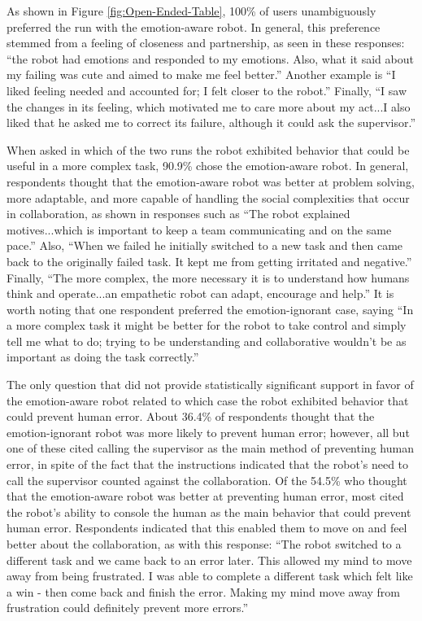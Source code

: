 \documentclass[12pt]{report}
\begin{document}
As shown in Figure \ref{fig:Open-Ended-Table}, 100\% of users unambiguously
preferred the run with the emotion-aware robot. In general, this preference
stemmed from a feeling of closeness and partnership, as seen in these responses:
``the robot had emotions and responded to my emotions. Also, what it said about
my failing was cute and aimed to make me feel better.'' Another example is ``I
liked feeling needed and accounted for; I felt closer to the robot.'' Finally,
``I saw the changes in its feeling, which motivated me to care more about my
act...I also liked that he asked me to correct its failure, although it could
ask the supervisor.''  

When asked in which of the two runs the robot exhibited behavior that could be
useful in a more complex task, 90.9\% chose the emotion-aware robot. In general,
respondents thought that the emotion-aware robot was better at problem solving,
more adaptable, and more capable of handling the social complexities that occur
in collaboration, as shown in responses such as ``The robot explained
motives...which is important to keep a team communicating and on the same
pace.'' Also, ``When we failed he initially switched to a new task and then came
back to the originally failed task. It kept me from getting irritated and
negative.'' Finally, ``The more complex, the more necessary it is to understand
how humans think and operate...an empathetic robot can adapt, encourage and
help.'' It is worth noting that one respondent preferred the emotion-ignorant
case, saying ``In a more complex task it might be better for the robot to take
control and simply tell me what to do; trying to be understanding and
collaborative wouldn't be as important as doing the task correctly.''

The only question that did not provide statistically significant support in
favor of the emotion-aware robot related to which case the robot exhibited
behavior that could prevent human error. About 36.4\% of respondents thought
that the emotion-ignorant robot was more likely to prevent human error; however, all
but one of these cited calling the supervisor as the main method of preventing
human error, in spite of the fact that the instructions indicated that the
robot's need to call the supervisor counted against the collaboration. Of the
54.5\% who thought that the emotion-aware robot was better at preventing human
error, most cited the robot's ability to console the human as the main behavior
that could prevent human error. Respondents indicated that this enabled them to
move on and feel better about the collaboration, as with this response: ``The
robot switched to a different task and we came back to an error later. This
allowed my mind to move away from being frustrated. I was able to complete a
different task which felt like a win - then come back and finish the error.
Making my mind move away from frustration could definitely prevent more
errors.''
\end{document}
